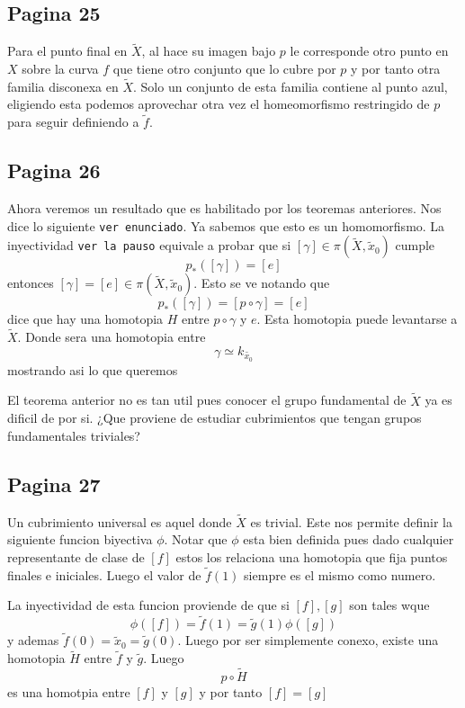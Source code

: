\documentclass[letterpaper]{article}
\begin{document}
\subsection*{Pagina 25}
Para el punto final en \(\tilde X\), al hace su imagen bajo \(p\) le
corresponde otro punto en \(X\) sobre la curva \(f\) que tiene otro
conjunto que lo cubre por \(p\) y por tanto otra familia disconexa en
\(\tilde X\). Solo un conjunto de esta familia contiene al punto azul,
eligiendo esta podemos aprovechar otra vez el homeomorfismo restringido
de \(p\) para seguir definiendo a \(\tilde f\).

\subsection*{Pagina 26}
Ahora veremos un resultado que es habilitado por los teoremas
anteriores. Nos dice lo siguiente \texttt{ver enunciado}.
Ya sabemos que esto es un homomorfismo. La inyectividad \texttt{ver la
  pauso}
equivale a
probar que si \([\gamma] \in \pi (\tilde X, \tilde x_0)\) cumple
\[ p_* ([\gamma]) = [e]\]
entonces \([\gamma] = [e] \in \pi (\tilde X, \tilde x_0)\). Esto se ve
notando que
\[ p_* ([\gamma]) = [p \circ \gamma] = [e]\]
dice que hay una homotopia \(H\) entre \(p \circ \gamma\) y \(e\). Esta
homotopia puede levantarse a \(\tilde X\). Donde sera una homotopia
entre
\[ \gamma \simeq k_{\tilde {x_0}} \]
mostrando asi lo que queremos

El teorema anterior no es tan util pues conocer el grupo fundamental de
\(\tilde X\) ya es dificil de por si. ¿Que proviene de estudiar
cubrimientos que tengan grupos fundamentales triviales?

\subsection*{Pagina 27}
Un cubrimiento universal es aquel donde \(\tilde X\) es trivial. Este
nos permite definir la siguiente funcion biyectiva \(\phi\). Notar que
\(\phi\) esta bien definida pues dado cualquier representante de clase
de \([f]\) estos los relaciona una homotopia que fija puntos finales e
iniciales. Luego el valor de \(\tilde f (1)\) siempre es el mismo como
numero.

La inyectividad de esta funcion proviende de que si \([f] , [g]\) son
tales wque
\[ \phi ([f]) = \tilde f (1) = \tilde g (1) \phi ([g]) \]
y ademas \(\tilde f (0) = \tilde x_0 = \tilde g (0)\). Luego por ser
simplemente conexo, existe una homotopia \(\tilde H\) entre \(\tilde f\)
y \(\tilde g\). Luego
\[ p \circ \tilde H \]
es una homotpia entre \([f]\) y \([g]\) y por tanto \([f] = [g] \)
\end{document}
